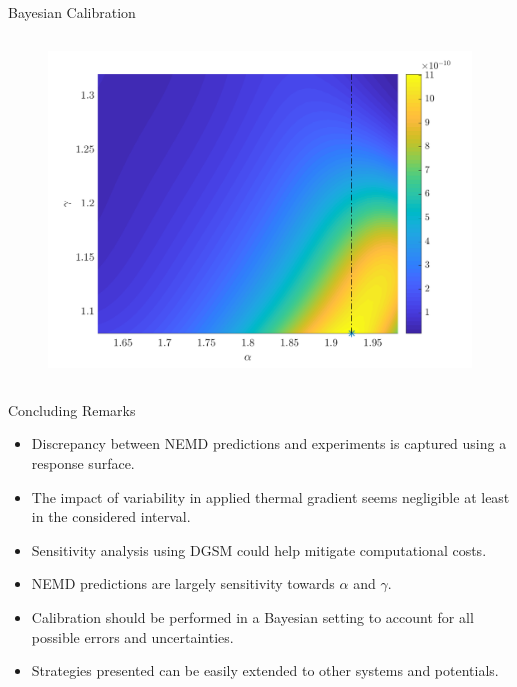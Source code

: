 \documentclass[xcolor={x11names,table},compress,svgnames,mathserif]{beamer}
\renewcommand{\(}{\begin{columns}}
\renewcommand{\)}{\end{columns}}
\newcommand{\<}[1]{\begin{column}{#1}}
\renewcommand{\>}{\end{column}}
\newcommand*\myitem{%
  \item[\color{DeepSkyBlue4}\scalebox{0.6}{\ding{110}}]}
\begin{document}
\begin{frame}{Bayesian Calibration}
\begin{columns}
\begin{column}{0.45\textwidth}
\begin{center}
\vspace{-20mm}
\begin{figure}[htbp]
\hspace{3mm}
  \includegraphics[width=1.0\textwidth]{./Figures/gl}
  \end{figure}
\end{center}

\end{column}
\end{columns}

\end{frame}



\begin{frame}{Concluding Remarks}

\begin{itemize}

\myitem Discrepancy between NEMD predictions and experiments is captured using a response surface. 
\pause
\vspace{2mm}
\myitem The impact of variability in applied thermal gradient seems negligible at least in the considered interval. 
\pause
\vspace{2mm}
\myitem Sensitivity analysis using DGSM could help mitigate computational costs.  
\pause
\vspace{2mm}
\myitem NEMD predictions are largely sensitivity towards $\alpha$ and $\gamma$.
\pause
\vspace{2mm}
\myitem Calibration should be performed in a Bayesian setting to account for all possible errors and uncertainties.  
\pause
\vspace{2mm}
\myitem Strategies presented can be easily extended to other systems and potentials.  

\end{itemize}

\end{frame}
\end{document}
